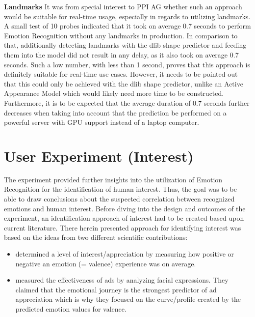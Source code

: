 \textbf{Landmarks}\newline
It was from special interest to PPI AG whether such an approach would be suitable for real-time usage, especially in regards to utilizing landmarks. 
\newline\newline
A small test of 10 probes indicated that it took on average 0.7 seconds to perform Emotion Recognition without any landmarks in production. In comparison to that, additionally detecting landmarks with the dlib shape predictor \citep{Kazemi:2014:ShapePredictor} and feeding them into the model did not result in any delay, as it also took on average 0.7 seconds. Such a low number, with less than 1 second, proves that this approach is definitely suitable for real-time use cases. 
\newline\newline
However, it needs to be pointed out that this could only be achieved with the dlib shape predictor, unlike an Active Appearance Model which would likely need more time to be constructed. Furthermore, it is to be expected that the average duration of 0.7 seconds further decreases when taking into account that the prediction be performed on a powerful server with GPU support instead of a laptop computer.

\section{User Experiment (Interest)}
The experiment provided further insights into the utilization of Emotion Recognition for the identification of human interest. Thus, the goal was to be able to draw conclusions about the suspected correlation between recognized emotions and human interest. Before diving into the design and outcomes of the experiment, an identification approach of interest had to be created based upon current literature.
\newline\newline
There herein presented approach for identifying interest was based on the ideas from two different scientific contributions:
\begin{itemize}
    \item \citet{Kamaruddin:2016:MeasuringCustomerSatisfaction} determined a level of interest/appreciation by measuring how positive or negative an emotion (= valence) experience was on average.
    \item \citet{Poirier:2016:AdsFacialExpression} measured the effectiveness of ads by analyzing facial expressions. They claimed that the emotional journey is the strongest predictor of ad appreciation which is why they focused on the curve/profile created by the predicted emotion values for valence.
\end{itemize}


